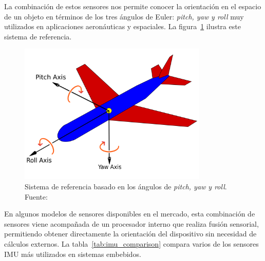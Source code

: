 \begin{itemize}
    La combinación de estos sensores nos permite conocer la orientación en el espacio de un objeto en términos de los tres ángulos de Euler: \emph{pitch, yaw y roll} muy utilizados en aplicaciones aeronáuticas y espaciales.
    La figura~\ref{fig:pitch_yaw_roll} ilustra este sistema de referencia.
    \begin{figure}[h]
        \centering
        \includegraphics[width=0.8\textwidth]{Imagenes/Bitmap/pitch_yaw_roll}
        \caption{Sistema de referencia basado en los ángulos de \emph{pitch, yaw y roll}. Fuente: \cite{wiki_principal_axes}}
        \label{fig:pitch_yaw_roll}
    \end{figure}

    En algunos modelos de sensores disponibles en el mercado, esta combinación de sensores viene acompañada de un procesador interno que realiza fusión sensorial,
    permitiendo obtener directamente la orientación del dispositivo sin necesidad de cálculos externos.
    La tabla~\ref{tab:imu_comparison} compara varios de los sensores IMU más utilizados en sistemas embebidos.


\end{itemize}
